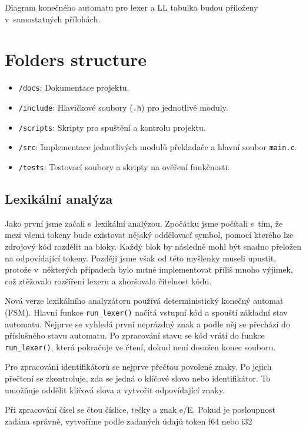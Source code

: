 \documentclass[a4paper, 11pt]{article}
\begin{document}
    Diagram konečného automatu pro lexer a LL tabulka budou přiloženy v~samostatných přílohách.

\section*{Folders structure}

\begin{itemize}
    \item \texttt{/docs}: Dokumentace projektu.
    \item \texttt{/include}: Hlavičkové soubory (\texttt{.h}) pro jednotlivé moduly.
    \item \texttt{/scripts}: Skripty pro spuštění a kontrolu projektu.
    \item \texttt{/src}: Implementace jednotlivých modulů překladače a hlavní soubor \texttt{main.c}.
    \item \texttt{/tests}: Testovací soubory a skripty na ověření funkčnosti.
\end{itemize}
    
	\subsection{Lexikální analýza}

    Jako první jsme začali s~lexikální analýzou. Zpočátku jsme počítali s~tím, že mezi všemi tokeny bude existovat nějaký oddělovací symbol, pomocí kterého lze zdrojový kód rozdělit na bloky. Každý blok by následně mohl být snadno přeložen na odpovídající tokeny. Později jsme však od této myšlenky museli upustit, protože v~některých případech bylo nutné implementovat příliš mnoho výjimek, což ztěžovalo rozšíření lexeru a zhoršovalo čitelnost kódu.  
    
    Nová verze lexikálního analyzátoru používá deterministický konečný automat (FSM). Hlavní funkce \texttt{run\_lexer()} načítá vstupní kód a spouští základní stav automatu. Nejprve se vyhledá první neprázdný znak a podle něj se přechází do příslušného stavu automatu. Po zpracování stavu se kód vrátí do funkce \texttt{run\_lexer()}, která pokračuje ve čtení, dokud není dosažen konec souboru.  
    
    Pro zpracování identifikátorů se nejprve přečtou povolené znaky. Po jejich přečtení se zkontroluje, zda se jedná o klíčové slovo nebo identifikátor. To umožňuje oddělit klíčová slova a vytvořit odpovídající znaky.
    
    Při zpracování čísel se čtou číslice, tečky a znak e/E. Pokud je posloupnost zadána správně, vytvoříme podle zadaných údajů token f64 nebo i32
    
\end{document}
